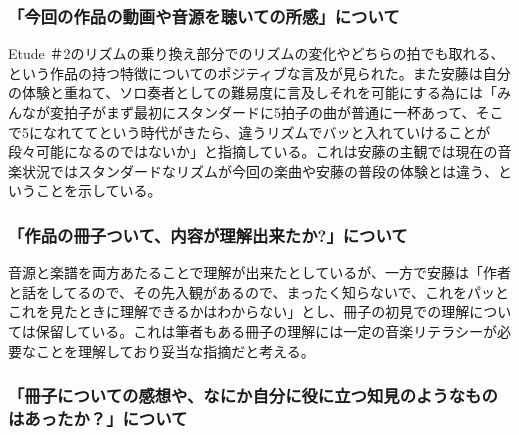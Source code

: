 \documentclass[uplatex,dvipdfmx]{ujarticle}
\begin{document}

\subsubsection{「今回の作品の動画や音源を聴いての所感」について}

Etude ＃2のリズムの乗り換え部分でのリズムの変化やどちらの拍でも取れる、という作品の持つ特徴についてのポジティブな言及が見られた。また安藤は自分の体験と重ねて、ソロ奏者としての難易度に言及しそれを可能にする為には「みんなが変拍子がまず最初にスタンダードに5拍子の曲が普通に一杯あって、そこで5になれててという時代がきたら、違うリズムでバッと入れていけることが段々可能になるのではないか」と指摘している。これは安藤の主観では現在の音楽状況ではスタンダードなリズムが今回の楽曲や安藤の普段の体験とは違う、ということを示している。

\subsubsection{「作品の冊子ついて、内容が理解出来たか?」について}

音源と楽譜を両方あたることで理解が出来たとしているが、一方で安藤は「作者と話をしてるので、その先入観があるので、まったく知らないで、これをパッとこれを見たときに理解できるかはわからない」とし、冊子の初見での理解については保留している。これは筆者もある冊子の理解には一定の音楽リテラシーが必要なことを理解しており妥当な指摘だと考える。

\subsubsection{「冊子についての感想や、なにか自分に役に立つ知見のようなものはあったか？」について}
\end{document}
